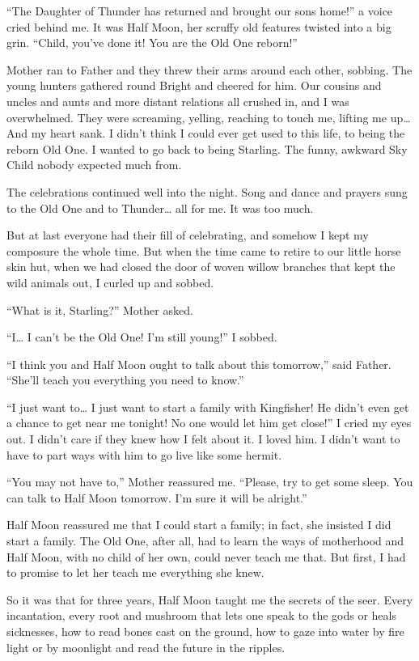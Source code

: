 ``The Daughter of Thunder has returned and brought our sons home!'' a voice cried behind me. It was Half Moon, her scruffy old features twisted into a big grin. ``Child, you've done it! You are the Old One reborn!''

Mother ran to Father and they threw their arms around each other, sobbing. The young hunters gathered round Bright and cheered for him. Our cousins and uncles and aunts and more distant relations all crushed in, and I was overwhelmed. They were screaming, yelling, reaching to touch me, lifting me up\ldots{} And my heart sank. I didn't think I could ever get used to this life, to being the reborn Old One. I wanted to go back to being Starling. The funny, awkward Sky Child nobody expected much from.

The celebrations continued well into the night. Song and dance and prayers sung to the Old One and to Thunder\ldots{} all for me. It was too much.

But at last everyone had their fill of celebrating, and somehow I kept my composure the whole time. But when the time came to retire to our little horse skin hut, when we had closed the door of woven willow branches that kept the wild animals out, I curled up and sobbed.

``What is it, Starling?'' Mother asked.

``I\ldots{} I can't be the Old One! I'm still young!'' I sobbed.

``I think you and Half Moon ought to talk about this tomorrow,'' said Father. ``She'll teach you everything you need to know.''

``I just want to\ldots{} I just want to start a family with Kingfisher! He didn't even get a chance to get near me tonight! No one would let him get close!'' I cried my eyes out. I didn't care if they knew how I felt about it. I loved him. I didn't want to have to part ways with him to go live like some hermit.

``You may not have to,'' Mother reassured me. ``Please, try to get some sleep. You can talk to Half Moon tomorrow. I'm sure it will be alright.''

\secdiv

\noindent Half Moon reassured me that I could start a family; in fact, she insisted I did start a family. The Old One, after all, had to learn the ways of motherhood and Half Moon, with no child of her own, could never teach me that. But first, I had to promise to let her teach me everything she knew.

So it was that for three years, Half Moon taught me the secrets of the seer. Every incantation, every root and mushroom that lets one speak to the gods or heals sicknesses, how to read bones cast on the ground, how to gaze into water by fire light or by moonlight and read the future in the ripples.

